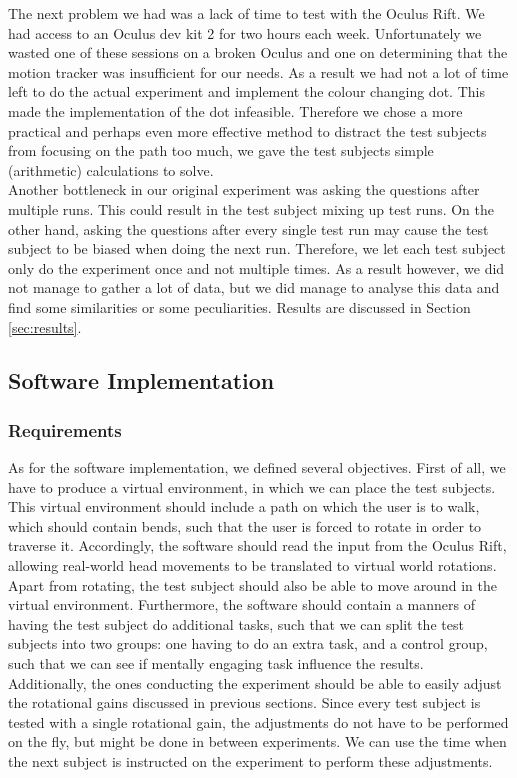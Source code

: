 The next problem we had was a lack of time to test with the Oculus Rift. 
We had access to an Oculus dev kit 2 for two hours each week.
Unfortunately we wasted one of these sessions on a broken Oculus and one on determining that the motion tracker was insufficient for our needs.
As a result we had not a lot of time left to do the actual experiment and implement the colour changing dot. 
This made the implementation of the dot infeasible. 
Therefore we chose a more practical and perhaps even more effective method to distract the test subjects from focusing on the path too much, we gave the test subjects simple (arithmetic) calculations to solve.\\

Another bottleneck in our original experiment was asking the questions after multiple runs.
This could result in the test subject mixing up test runs. 
On the other hand, asking the questions after every single test run may cause the test subject to be biased when doing the next run.
Therefore, we let each test subject only do the experiment once and not multiple times.
As a result however, we did not manage to gather a lot of data, but we did manage to analyse this data and find some similarities or some peculiarities.
Results are discussed in Section \ref{sec:results}.

\subsection{Software Implementation}
\subsubsection{Requirements}
As for the software implementation, we defined several objectives.
First of all, we have to produce a virtual environment, in which we can place the test subjects.
This virtual environment should include a path on which the user is to walk, which should contain bends, such that the user is forced to rotate in order to traverse it.
Accordingly, the software should read the input from the Oculus Rift, allowing real-world head movements to be translated to virtual world rotations.
Apart from rotating, the test subject should also be able to move around in the virtual environment.
Furthermore, the software should contain a manners of having the test subject do additional tasks, such that we can split the test subjects into two groups: one having to do an extra task, and a control group, such that we can see if mentally engaging task influence the results.\\
Additionally, the ones conducting the experiment should be able to easily adjust the rotational gains discussed in previous sections.
Since every test subject is tested with a single rotational gain, the adjustments do not have to be performed on the fly, but might be done in between experiments. 
We can use the time when the next subject is instructed on the experiment to perform these adjustments.

